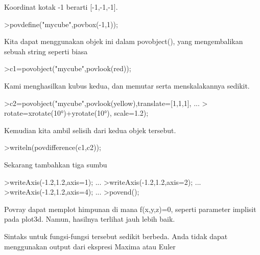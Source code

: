 \documentclass[12pt,arial,letterpaper]{book}
\begin{document}
\begin{eulernootebook}
\begin{eulercomment}
\begin{eulercomment}
\begin{eulernootebook}
\begin{eulercomment}
\begin{eulercomment}
\begin{eulercomment}
\begin{eulercomment}
\begin{eulercomment}
\begin{eulercomment}
\begin{eulercomment}
\begin{eulernotebook}
\begin{eulercomment}
Koordinat kotak -1 berarti [-1,-1,-1].
\end{eulercomment}
\begin{eulerprompt}
>povdefine("mycube",povbox(-1,1));
\end{eulerprompt}
\begin{eulercomment}
Kita dapat menggunakan objek ini dalam povobject(), yang mengembalikan
sebuah string seperti biasa
\end{eulercomment}
\begin{eulerprompt}
>c1=povobject("mycube",povlook(red));
\end{eulerprompt}
\begin{eulercomment}
Kami menghasilkan kubus kedua, dan memutar serta menskalakannya
sedikit.
\end{eulercomment}
\begin{eulerprompt}
>c2=povobject("mycube",povlook(yellow),translate=[1,1,1], ...
>  rotate=xrotate(10°)+yrotate(10°), scale=1.2);
\end{eulerprompt}
\begin{eulercomment}
Kemudian kita ambil selisih dari kedua objek tersebut.
\end{eulercomment}
\begin{eulerprompt}
>writeln(povdifference(c1,c2));
\end{eulerprompt}
\begin{eulercomment}
Sekarang tambahkan tiga sumbu
\end{eulercomment}
\begin{eulerprompt}
>writeAxis(-1.2,1.2,axis=1); ...
>writeAxis(-1.2,1.2,axis=2); ...
>writeAxis(-1.2,1.2,axis=4); ...
>povend();
\end{eulerprompt}
\begin{eulercomment}
Povray dapat memplot himpunan di mana f(x,y,z)=0, seperti parameter
implisit pada plot3d. Namun, hasilnya terlihat jauh lebih baik.

Sintaks untuk fungsi-fungsi tersebut sedikit berbeda. Anda tidak dapat
menggunakan output dari ekspresi Maxima atau Euler


\end{eulercomment}
\end{eulernotebook}
\end{eulercomment}
\end{eulercomment}
\end{eulercomment}
\end{eulercomment}
\end{eulercomment}
\end{eulercomment}
\end{eulercomment}
\end{eulernootebook}
\end{eulercomment}
\end{eulercomment}
\end{eulernootebook}
\end{document}
